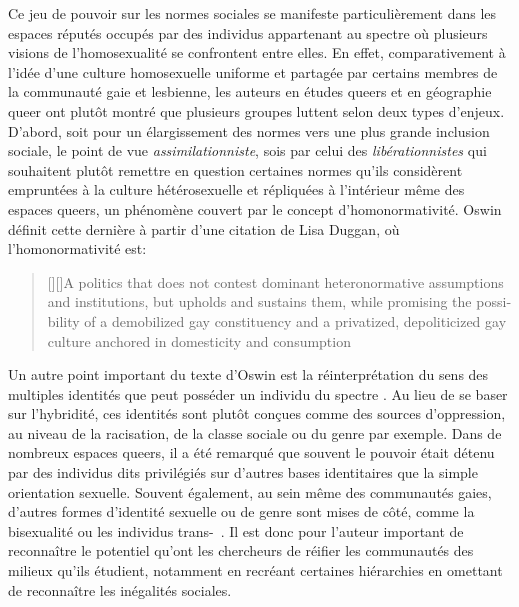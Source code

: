 Ce jeu de pouvoir sur les normes sociales se manifeste particulièrement dans les espaces réputés occupés par des individus appartenant au spectre \lgbt{} où plusieurs visions de l'homosexualité se confrontent entre elles. 
En effet, comparativement à l'idée d'une culture homosexuelle uniforme et partagée par certains membres de la communauté gaie et lesbienne, les auteurs en études queers et en géographie queer ont plutôt montré que plusieurs groupes luttent selon deux types d'enjeux.
D'abord, soit pour un élargissement des normes vers une plus grande inclusion sociale, le point de vue \emph{assimilationniste}, sois par celui des \emph{libérationnistes} qui souhaitent plutôt remettre en question certaines normes qu'ils considèrent empruntées à la culture hétérosexuelle et répliquées à l'intérieur même des espaces queers, un phénomène couvert par le concept d'homonormativité. 
Oswin définit cette dernière à partir d'une citation de Lisa Duggan, où l'homonormativité est: 
\foreignblockquote{english}[{\cite[tel que cité dans][92]{Oswin2008}}][]{[{\cite[50]{Duggan2003}}][]{A politics that does not contest dominant heteronormative assumptions and institutions, but upholds and sustains them, while promising the possibility of a demobilized gay constituency and a privatized, depoliticized gay culture anchored in domesticity and consumption}}.

Un autre point important du texte d'Oswin est la réinterprétation du sens des multiples identités que peut posséder un individu du spectre \lgbt{}. 
Au lieu de se baser sur l'hybridité, ces identités sont plutôt conçues comme des sources d'oppression, au niveau de la racisation, de la classe sociale ou du genre par exemple. 
Dans de nombreux espaces queers, il a été remarqué que souvent le pouvoir était détenu par des individus dits privilégiés sur d'autres bases identitaires que la simple orientation sexuelle. 
Souvent également, au sein même des communautés gaies, d'autres formes d'identité sexuelle ou de genre sont mises de côté, comme la bisexualité ou les individus trans-~\citep[93]{Oswin2008}.
Il est donc pour l'auteur important de reconnaître le potentiel qu'ont les chercheurs de réifier les communautés des milieux qu'ils étudient, notamment en recréant certaines hiérarchies en omettant de reconnaître les inégalités sociales.

